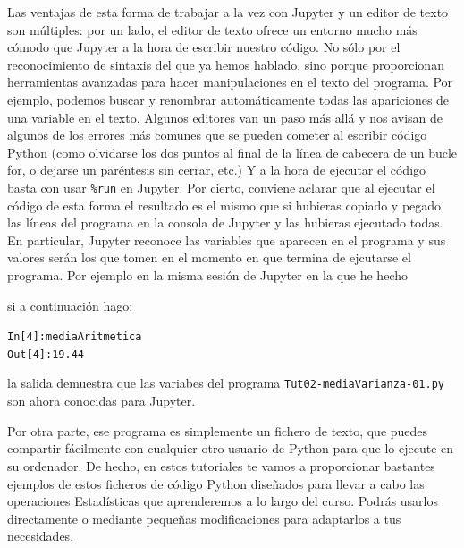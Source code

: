 \documentclass[10pt,a4paper]{article}\usepackage[]{graphicx}\usepackage[]{color}
\makeatletter
\newcommand{\hlnum}[1]{\textcolor[rgb]{0.686,0.059,0.569}{#1}}%
\newcommand{\hlopt}[1]{\textcolor[rgb]{0,0,0}{#1}}%
\newcommand{\hlstd}[1]{\textcolor[rgb]{0.345,0.345,0.345}{#1}}%
\newenvironment{kframe}{%
 \def\at@end@of@kframe{}%
 \ifinner\ifhmode%
  \def\at@end@of@kframe{\end{minipage}}%
  \begin{minipage}{\columnwidth}%
 \fi\fi%
 \def\FrameCommand##1{\hskip\@totalleftmargin \hskip-\fboxsep
 \colorbox{shadecolor}{##1}\hskip-\fboxsep
     \hskip-\linewidth \hskip-\@totalleftmargin \hskip\columnwidth}%
 \MakeFramed {\advance\hsize-\width
   \@totalleftmargin\z@ \linewidth\hsize
   \@setminipage}}%
 {\par\unskip\endMakeFramed%
 \at@end@of@kframe}
\newenvironment{knitrout}{}{} %
\newcounter {cont01}
\makeatother
\begin{document}
Las ventajas de esta forma de trabajar a la vez con Jupyter y un editor de texto son múltiples: por un lado, el editor de texto ofrece un entorno mucho más cómodo que Jupyter a la hora de escribir nuestro código. No sólo
por el reconocimiento de sintaxis del que ya hemos hablado, sino porque proporcionan herramientas avanzadas para hacer manipulaciones en el texto del programa. Por ejemplo, podemos buscar y renombrar automáticamente todas las apariciones de una variable en el texto. Algunos editores van un paso más allá y nos avisan de algunos de los errores más comunes que se pueden cometer al escribir código Python (como olvidarse los dos puntos al final de la línea de cabecera de un bucle for, o dejarse un paréntesis sin cerrar, etc.) Y a la hora de ejecutar el código basta con usar \verb#%run#
en Jupyter. Por cierto, conviene aclarar que al ejecutar el código de esta forma el resultado es el mismo que si hubieras copiado y pegado las líneas del programa en la consola de Jupyter y las hubieras ejecutado todas. En particular, Jupyter reconoce las variables que aparecen en el programa y sus valores serán los que tomen en el momento en que termina de ejcutarse el programa. Por ejemplo en la misma sesión de Jupyter en la que he hecho
\begin{knitrout}
\color{fgcolor}\begin{kframe}
\begin{alltt}
\end{alltt}
\end{kframe}
\end{knitrout}
si a continuación hago:
\begin{knitrout}
\color{fgcolor}\begin{kframe}
\begin{alltt}
\hlstd{In [}\hlnum{4}\hlstd{]}\hlopt{:} \hlstd{mediaAritmetica}
\hlstd{Out[}\hlnum{4}\hlstd{]}\hlopt{:} \hlnum{19.44}
\end{alltt}
\end{kframe}
\end{knitrout}
la salida demuestra que las variabes del programa {\tt Tut02-mediaVarianza-01.py} son ahora conocidas para Jupyter.

Por otra parte, ese programa es simplemente un fichero de texto, que puedes compartir fácilmente con cualquier otro usuario de Python para que lo ejecute en su ordenador. De hecho, en estos tutoriales te vamos a proporcionar bastantes ejemplos de estos ficheros de código Python diseñados para llevar a cabo las operaciones Estadísticas que aprenderemos a lo largo del curso. Podrás usarlos directamente o mediante pequeñas modificaciones para adaptarlos a tus necesidades.
\end{document}
